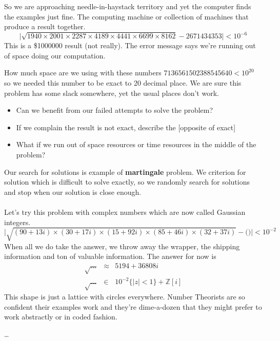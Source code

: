 \documentclass[12pt]{article}
\begin{document}
{\begin{verbatim}
\end{verbatim}
So we are approaching needle-in-haystack territory and yet the computer finds the examples just fine.  The computing machine or collection of machines that produce a result together.
$$ \Big| \sqrt{ 1940 \times 2001 \times 2287 \times 4189 \times 4441 \times 6699 \times 8162 } - 2671434353 \Big| < 10^{-6} $$
This is a \$1000000 result (not really).  The error message says we're running out of space doing our computation. 

\newpage 

How much space are we using with these numbers $713 6561 5023 8854 5640 < 10^{20}$ so we needed this number to be exact to 20 decimal place.  We are sure this problem has some slack somewhere, yet the usual places don't work.  
\begin{itemize}
\item Can we benefit from our failed attempts to solve the problem?
\item If we complain the result is not exact, describe the [opposite of exact]
\item What if we run out of space resources or time resources in the middle of the problem?
\end{itemize}
Our search for solutions is example of \textbf{martingale} problem.  We criterion for solution which is difficult to solve exactly, so we randomly search for solutions and stop when our solution is close enough. \\ \\
Let's try this problem with complex numbers which are now called Gaussian integers.  
$$ \Big| \sqrt{(90 + 13i) \times (30 + 17i) \times (15 +92i) \times (85 + 46i) \times (32 + 37i)} - \big(  \big) \Big| < 10^{-2}  $$
When all we do take the answer, we throw away the wrapper, the shipping information and ton of valuable information.  The answer for now is 
\begin{eqnarray*} \sqrt{\dots} &\approx& 5194 + 36808i \\
\sqrt{\dots} & \in & 10^{-2} \{ |z| < 1 \} + \mathbb{Z}[i] 
\end{eqnarray*}
This shape is just a lattice with circles everywhere.  Number Theorists are so confident their examples work and they're dime-a-dozen that they might prefer to work abstractly or in coded fashion.


\noindent 
 
}
\vfill

\begin{thebibliography}{}

\item \dots

\end{thebibliography}
\end{document}

